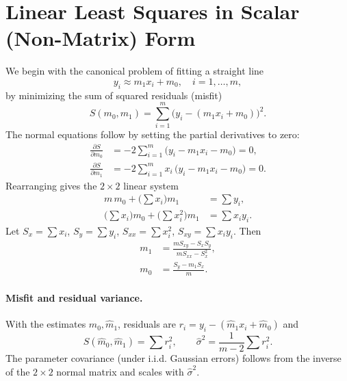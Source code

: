 \documentclass[11pt,a4paper]{article}
\begin{document}
\section{Linear Least Squares in Scalar (Non-Matrix) Form}
\label{sec:scalar-lls}

We begin with the canonical problem of fitting a straight line
\begin{equation}
  y_i \approx m_1 x_i + m_0, \quad i=1,\dots,m,
\end{equation}
by minimizing the sum of squared residuals (misfit)
\begin{equation}
  S(m_0,m_1) = \sum_{i=1}^m \big(y_i - (m_1 x_i + m_0)\big)^2.
\end{equation}
The normal equations follow by setting the partial derivatives to zero:
\begin{align}
  \frac{\partial S}{\partial m_0} &= -2\sum_{i=1}^m \big(y_i - m_1 x_i - m_0\big) = 0, \\
  \frac{\partial S}{\partial m_1} &= -2\sum_{i=1}^m x_i\,\big(y_i - m_1 x_i - m_0\big) = 0.
\end{align}
Rearranging gives the $2\times2$ linear system
\begin{align}
  m\,m_0 + \Big(\sum x_i\Big) m_1 &= \sum y_i, \\
  \Big(\sum x_i\Big) m_0 + \Big(\sum x_i^2\Big) m_1 &= \sum x_i y_i.
\end{align}
Let $\displaystyle S_x=\sum x_i$, $\displaystyle S_y=\sum y_i$, $\displaystyle S_{xx}=\sum x_i^2$, $\displaystyle S_{xy}=\sum x_i y_i$. Then
\begin{align}
  m_1 &= \frac{m S_{xy} - S_x S_y}{m S_{xx} - S_x^2}, \\
  m_0 &= \frac{S_y - m_1 S_x}{m}.
\end{align}
\paragraph{Misfit and residual variance.} With the estimates $\widehat{m}_0,\widehat{m}_1$, residuals are $r_i = y_i - (\widehat{m}_1 x_i + \widehat{m}_0)$ and
\begin{equation}
  S(\widehat{m}_0,\widehat{m}_1) = \sum r_i^2, \qquad
  \widehat{\sigma}^2 = \frac{1}{m-2}\sum r_i^2.
\end{equation}
The parameter covariance (under i.i.d. Gaussian errors) follows from the inverse of the $2\times2$ normal matrix and scales with $\widehat{\sigma}^2$.
\end{document}
